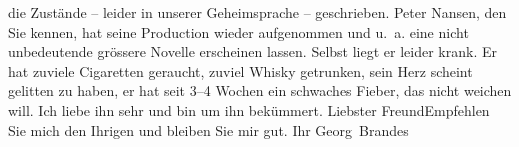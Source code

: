 \begin{ledgroupsized}[t]{13cm}
               die Zustände – leider in unserer Geheimsprache – geschrieben.\pend
           \pstart
           Peter Nansen, den Sie kennen, hat seine
               Production wieder aufgenommen und u. a. eine nicht unbedeutende grössere Novelle erscheinen lassen.
               Selbst liegt er leider krank. Er hat zuviele {\pb}Cigaretten geraucht, zuviel Whisky
               getrunken, sein Herz scheint gelitten zu haben, er hat seit 3–4 Wochen ein schwaches Fieber, das nicht weichen will. Ich liebe
               ihn sehr und bin um ihn bekümmert.\pend
           \pstart
           Liebster Freund\hspace*{1.5em}Empfehlen Sie mich den Ihrigen und
               bleiben Sie mir gut.\pend
           \pstart Ihr \spacefill\mbox{Georg Brandes}\pend{}
         
         \endnumbering{}\end{ledgroupsized}  \newcommand{\dateiname}{L02221}\newcommand{\titel}{Georg Brandes an Arthur Schnitzler, 4. 12. 1915}\newcommand{\editorInnen}{Martin Anton Müller und Gerd-Hermann Susen}
      